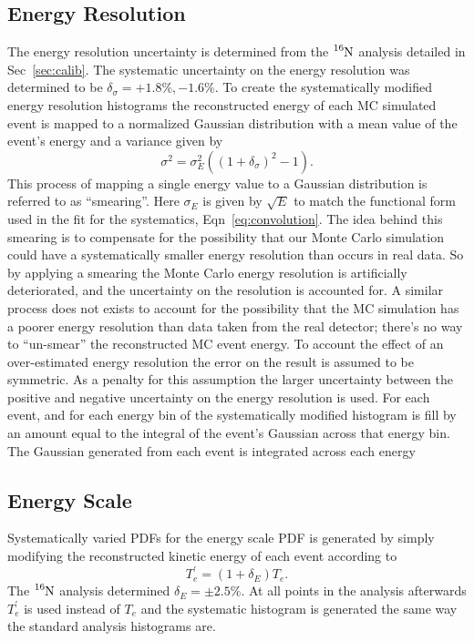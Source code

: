 \subsection{Energy Resolution}
The energy resolution uncertainty is determined from the $\ce{^{16}N}$ analysis
detailed in Sec~\ref{sec:calib}.
The systematic uncertainty on the energy resolution was determined to be $\delta_{\sigma} = +1.8\%, -1.6\%$. %
To create the systematically modified energy resolution histograms the reconstructed
energy of each MC simulated event is mapped to a normalized Gaussian distribution with a
mean value of the event's energy and a
variance given by
\begin{equation}
  \sigma^{2} = \sigma_{E}^{2}\left(\left(1 + \delta_{\sigma}\right)^2 - 1\right)\text{.}
  \label{eqn:systmatic_esmear}
\end{equation}
This process of mapping a single energy value to a Gaussian distribution is
referred to as ``smearing''.
Here $\sigma_{E}$ is given by $\sqrt{E}$ to match the functional form used in
the fit for the systematics, Eqn~\ref{eq:convolution}.
The idea behind this smearing is to compensate for the possibility that our
Monte Carlo simulation could have a systematically smaller energy resolution
than occurs in real data.
So by applying a smearing the Monte Carlo energy resolution is artificially
deteriorated, and the uncertainty on the resolution is accounted for.
A similar process does not exists to account for the possibility that the
MC simulation has a poorer energy resolution than data taken from the
real detector; there's no way to ``un-smear'' the reconstructed MC event
energy.
To account the effect of an over-estimated energy resolution the error on
the result is assumed to be symmetric.
As a penalty for this assumption the larger uncertainty between the positive
and negative uncertainty on the energy resolution is used.
For each event, and for each energy bin of the systematically modified histogram
is fill by an amount equal to the integral of the event's Gaussian across that
energy bin.
The Gaussian generated from each event is integrated across each energy

\subsection{Energy Scale}
Systematically varied PDFs for the energy scale PDF is generated by simply
modifying the reconstructed kinetic energy of each event according to
\begin{equation}
  T^{\prime}_{e} = (1+\delta_{E})T_{e}\text{.}
\end{equation}
The $\ce{^{16}N}$ analysis determined $\delta_{E} = \pm 2.5\%$.
At all points in the analysis afterwards $T^{\prime}_{e}$ is used instead of $T_{e}$
and the systematic histogram is generated the same way the standard analysis histograms
are.

